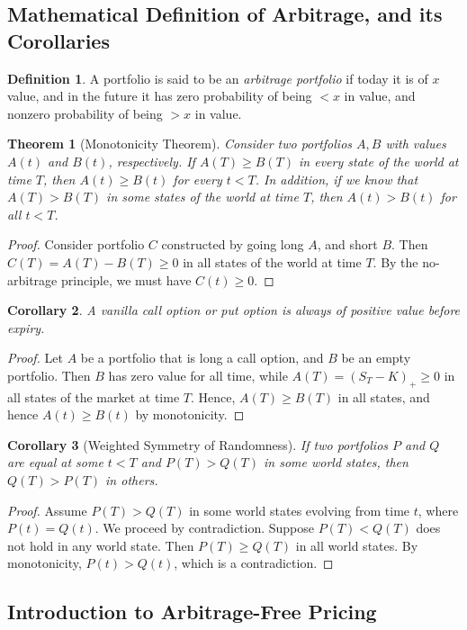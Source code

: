 \documentclass[12pt]{article}
\theoremstyle{plain}
\newtheorem{theorem}{Theorem}
\newtheorem{corollary}[theorem]{Corollary}
\theoremstyle{definition}
\newtheorem*{definition}{Definition}
\theoremstyle{remark}
\numberwithin{equation}{section}  %
\begin{document}
\subsection{Mathematical Definition of Arbitrage, and its Corollaries}
\begin{definition}
	A portfolio is said to be an \emph{arbitrage portfolio} if today it is
	of $x$ value, and in the future it has zero probability of being $<x$ in 
	value,
	and nonzero probability of being $>x$ in value. 
\end{definition}
\begin{theorem}[Monotonicity Theorem]
	Consider two portfolios $A, B$ with values $A(t)$ and $B(t)$, respectively. 
	If $A(T) \ge B(T)$ in every state of the world at time $T$, then
	$A(t) \ge B(t)$ for every $t < T$. In addition, if we know that
	$A(T) > B(T)$ in some states of the world at time $T$, then
	$A(t) > B(t)$ for all $t < T$. 
\end{theorem}
\begin{proof}
	Consider portfolio $C$ constructed by going long $A$, and short $B$. Then
	$C(T) = A(T) - B(T) \ge 0$ in all states of the world at time $T$. 
	By the no-arbitrage principle, we must have $C(t) \ge 0$. \qedhere
\end{proof}
\begin{corollary}
	A vanilla call option or put option is always of positive value before 
	expiry.
\end{corollary}
\begin{proof}
	Let $A$ be a portfolio that is long a call option, and $B$ be an empty
	portfolio.  Then $B$ has zero value for all time, while $A(T) = {(S_{T}
- K)}_{+} \ge 0$ in all states of the market at time $T$. Hence, $A(T) \ge
B(T)$ in all states, and hence $A(t) \ge B(t)$ by monotonicity.
\end{proof}
\begin{corollary}[Weighted Symmetry of Randomness]
	If two portfolios $P$ and $Q$ are equal at some $t < T$ and $P(T) > Q(T)$
	in some world states, then $Q(T) > P(T)$ in others. 
\end{corollary}
\begin{proof}
	Assume $P(T) > Q(T)$ in some world states evolving from time $t$, where
	$P(t) = Q(t)$. We proceed by contradiction. Suppose $P(T) < Q(T)$ does not 
	hold
	in any world state. Then $P(T) \ge Q(T)$ in all world states. By 
	monotonicity,
	$P(t) > Q(t)$, which is a contradiction.
\end{proof}
\subsection{Introduction to Arbitrage-Free Pricing}
\end{document}

